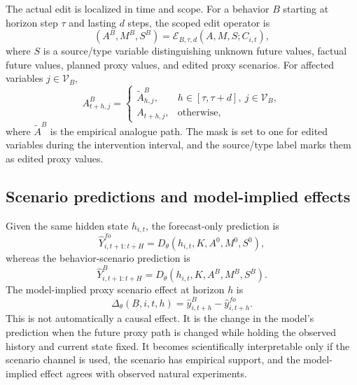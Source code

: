 The actual edit is localized in time and scope. For a behavior $B$ starting at horizon step $\tau$ and lasting $d$ steps, the scoped edit operator is
\begin{equation}
    (A^B,M^B,S^B)
    = \mathcal{E}_{B,\tau,d}(A,M,S;C_{i,t}),
    \label{eq:edit_operator}
\end{equation}
where $S$ is a source/type variable distinguishing unknown future values, factual future values, planned proxy values, and edited proxy scenarios. For affected variables $j\in\mathcal{V}_B$,
\begin{equation}
    A^B_{t+h,j}
    =
    \begin{cases}
        \tilde{A}^{B}_{h,j}, & h\in[\tau,\tau+d],\ j\in\mathcal{V}_B, \\
        A_{t+h,j}, & \mathrm{otherwise},
    \end{cases}
\end{equation}
where $\tilde{A}^{B}$ is the empirical analogue path. The mask is set to one for edited variables during the intervention interval, and the source/type label marks them as edited proxy values.

\subsection{Scenario predictions and model-implied effects}
\label{subsec:scenario_effect}

Given the same hidden state $h_{i,t}$, the forecast-only prediction is
\begin{equation}
    \hat{Y}^{fo}_{i,t+1:t+H}
    = D_\theta(h_{i,t},K,A^0,M^0,S^0),
\end{equation}
whereas the behavior-scenario prediction is
\begin{equation}
    \hat{Y}^{B}_{i,t+1:t+H}
    = D_\theta(h_{i,t},K,A^B,M^B,S^B).
\end{equation}
The model-implied proxy scenario effect at horizon $h$ is
\begin{equation}
    \Delta_\theta(B,i,t,h)
    = \hat{y}^{B}_{i,t+h} - \hat{y}^{fo}_{i,t+h}.
    \label{eq:model_effect}
\end{equation}
This is not automatically a causal effect. It is the change in the model's prediction when the future proxy path is changed while holding the observed history and current state fixed. It becomes scientifically interpretable only if the scenario channel is used, the scenario has empirical support, and the model-implied effect agrees with observed natural experiments.

